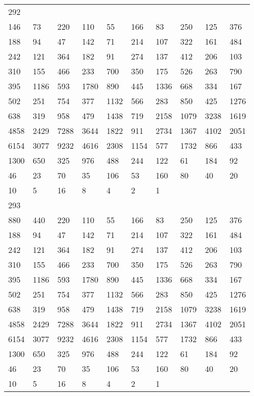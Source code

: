 \begin{longtable}{*{10}{l}}
292&&&&&&&&&\\
146& 73& 220& 110& 55& 166& 83& 250& 125& 376\\
188& 94& 47& 142& 71& 214& 107& 322& 161& 484\\
242& 121& 364& 182& 91& 274& 137& 412& 206& 103\\
310& 155& 466& 233& 700& 350& 175& 526& 263& 790\\
395& 1186& 593& 1780& 890& 445& 1336& 668& 334& 167\\
502& 251& 754& 377& 1132& 566& 283& 850& 425& 1276\\
638& 319& 958& 479& 1438& 719& 2158& 1079& 3238& 1619\\
4858& 2429& 7288& 3644& 1822& 911& 2734& 1367& 4102& 2051\\
6154& 3077& 9232& 4616& 2308& 1154& 577& 1732& 866& 433\\
1300& 650& 325& 976& 488& 244& 122& 61& 184& 92\\
46& 23& 70& 35& 106& 53& 160& 80& 40& 20\\
10& 5& 16& 8& 4& 2& 1& \\

293&&&&&&&&&\\
880& 440& 220& 110& 55& 166& 83& 250& 125& 376\\
188& 94& 47& 142& 71& 214& 107& 322& 161& 484\\
242& 121& 364& 182& 91& 274& 137& 412& 206& 103\\
310& 155& 466& 233& 700& 350& 175& 526& 263& 790\\
395& 1186& 593& 1780& 890& 445& 1336& 668& 334& 167\\
502& 251& 754& 377& 1132& 566& 283& 850& 425& 1276\\
638& 319& 958& 479& 1438& 719& 2158& 1079& 3238& 1619\\
4858& 2429& 7288& 3644& 1822& 911& 2734& 1367& 4102& 2051\\
6154& 3077& 9232& 4616& 2308& 1154& 577& 1732& 866& 433\\
1300& 650& 325& 976& 488& 244& 122& 61& 184& 92\\
46& 23& 70& 35& 106& 53& 160& 80& 40& 20\\
10& 5& 16& 8& 4& 2& 1& \\


\end{longtable}
